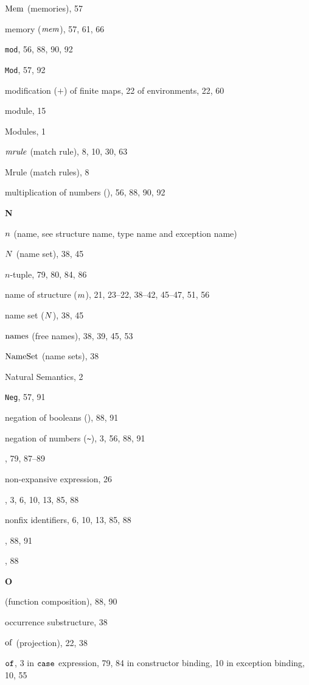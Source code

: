 \begin{theindex}
\item ${\rm Mem}$ (memories), 57
\item memory ($\mbox{\it mem}$), 57, 61, 66
\item {\tt mod}, 56, 88, 90, 92
\item {\tt Mod}, 57, 92
\item modification ($+$) 
\subitem of finite maps, 22
\subitem of environments, 22, 60
\item module, 15
\item Modules, 1
\item ${\it mrule}$ (match rule), 8, 10, 30, 63
\item Mrule (match rules), 8
\item multiplication of numbers (\ml{*}), 56, 88, 90, 92
\indexspace
\parbox{65mm}{\hfil{\large\bf N}\hfil}
\indexspace
\item $n$ (name, see structure name, type name and exception name) 
\item $N$ (name set), 38, 45
\item $n$-tuple, 79, 80, 84, 86
\item name 
\subitem of structure ($m$), 21, 23--22, 38--42, 45--47, 51, 56
\item name set ($N$), 38, 45
\item $\mathop{\rm names}\nolimits$ (free names), 38, 39, 45, 53
\item ${\rm NameSet}$ (name sets), 38
\item Natural Semantics, 2
\item {\tt Neg}, 57, 91
\item negation of booleans (), 88, 91
\item negation of numbers (\verb+~+), 3, 56, 88, 91
\item \NIL, 79, 87--89
\item non-expansive expression, 26
\item \NONFIX, 3, 6, 10, 13, 85, 88
\item nonfix identifiers, 6, 10, 13, 85, 88
\item {}, 88, 91
\item \NUM, 88
\indexspace
\parbox{65mm}{\hfil{\large\bf O}\hfil}
\indexspace
\item {} (function composition), 88, 90
\item occurrence 
\subitem substructure, 38
\item $\mathbin{\rm of}$ (projection), 22, 38
\item ${\tt of}$, 3
\subitem in ${\tt case}$ expression, 79, 84
\subitem in constructor binding, 10
\subitem in exception binding, 10, 55

\end{theindex}
